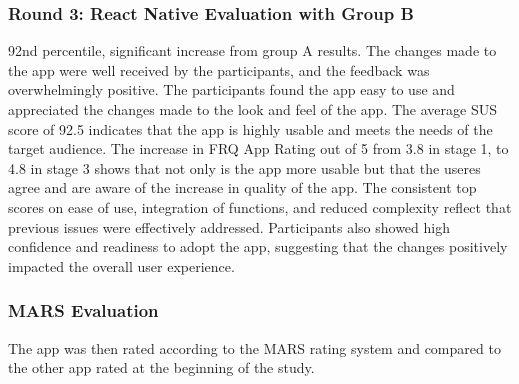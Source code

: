 \subsubsection{Round 3: React Native Evaluation with Group B}
92nd percentile, significant increase from group A results.
The changes made to the app were well received by the participants, and the feedback was overwhelmingly positive. The participants found the app easy to use and appreciated the changes made to the look and feel of the app. The average SUS score of 92.5 indicates that the app is highly usable and meets the needs of the target audience. The increase in FRQ App Rating out of 5 from 3.8 in stage 1, to 4.8 in stage 3 shows that not only is the app more usable but that the useres agree and are aware of the increase in quality of the app. The consistent top scores on ease of use, integration of functions, and reduced complexity reflect that previous issues were effectively addressed. Participants also showed high confidence and readiness to adopt the app, suggesting that the changes positively impacted the overall user experience. 

\subsubsection{MARS Evaluation}
The app was then rated according to the MARS rating system and compared to the other app rated at the beginning of the study. 


